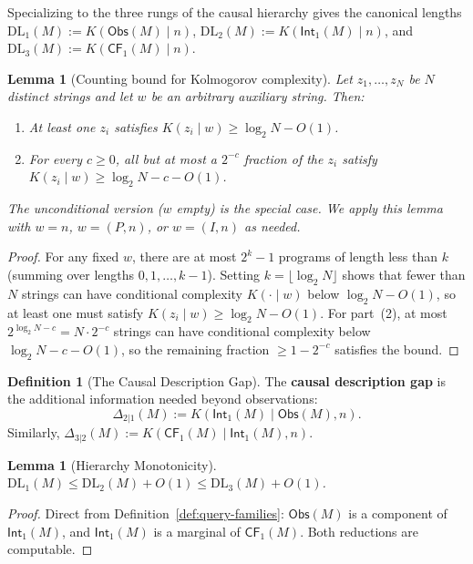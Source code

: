 \documentclass{article}
\theoremstyle{plain}
\newtheorem{lemma}[theorem]{Lemma}
\theoremstyle{definition}
\newtheorem{definition}[theorem]{Definition}
\newcommand{\Obs}{\mathsf{Obs}}
\newcommand{\Int}{\mathsf{Int}}
\newcommand{\CF}{\mathsf{CF}}
\newcommand{\DL}{\mathrm{DL}}
\begin{document}
Specializing to the three rungs of the causal hierarchy gives the canonical lengths
$\DL_1(M) := K(\Obs(M) \mid n)$,
$\DL_2(M) := K(\Int_1(M) \mid n)$, and
$\DL_3(M) := K(\CF_1(M) \mid n)$.

\begin{lemma}[Counting bound for Kolmogorov complexity]
\label{lem:counting}
Let $z_1, \ldots, z_N$ be $N$ distinct strings and let $w$ be an arbitrary auxiliary string. Then:
\begin{enumerate}
    \item At least one $z_i$ satisfies $K(z_i \mid w) \geq \log_2 N - O(1)$.
    \item For every $c \geq 0$, all but at most a $2^{-c}$ fraction of the $z_i$ satisfy $K(z_i \mid w) \geq \log_2 N - c - O(1)$.
\end{enumerate}
The unconditional version ($w$ empty) is the special case. We apply this lemma with $w = n$, $w = (P, n)$, or $w = (I, n)$ as needed.
\end{lemma}

\begin{proof}
For any fixed $w$, there are at most $2^k - 1$ programs of length less than $k$ (summing over lengths $0, 1, \ldots, k-1$). Setting $k = \lfloor \log_2 N \rfloor$ shows that fewer than $N$ strings can have conditional complexity $K(\cdot \mid w)$ below $\log_2 N - O(1)$, so at least one must satisfy $K(z_i \mid w) \geq \log_2 N - O(1)$. For part~(2), at most $2^{\log_2 N - c} = N \cdot 2^{-c}$ strings can have conditional complexity below $\log_2 N - c - O(1)$, so the remaining fraction $\geq 1 - 2^{-c}$ satisfies the bound.
\end{proof}

\begin{definition}[The Causal Description Gap]
The \textbf{causal description gap} is the additional information needed beyond observations:
\[
\Delta_{2|1}(M) := K(\Int_1(M) \mid \Obs(M), n).
\]
Similarly, $\Delta_{3|2}(M) := K(\CF_1(M) \mid \Int_1(M), n)$.
\end{definition}


\begin{lemma}[Hierarchy Monotonicity]
\label{lem:monotonicity}
$\DL_1(M) \leq \DL_2(M) + O(1) \leq \DL_3(M) + O(1)$.
\end{lemma}

\begin{proof}[Proof] Direct from Definition~\ref{def:query-families}: $\Obs(M)$ is a component of $\Int_1(M)$, and $\Int_1(M)$ is a marginal of $\CF_1(M)$. Both reductions are computable.\end{proof}
\end{document}
